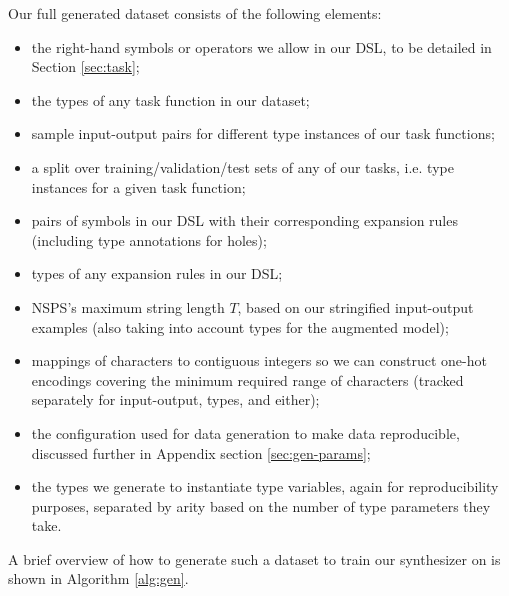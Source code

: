 \documentclass{article}
\begin{document}
Our full generated dataset consists of the following elements:
\begin{itemize}
    \item the right-hand symbols or operators we allow in our DSL, to be detailed in Section \ref{sec:task};
    \item the types of any task function in our dataset;
    \item sample input-output pairs for different type instances of our task functions;
    \item a split over training/validation/test sets of any of our tasks, i.e. type instances for a given task function;
    \item pairs of symbols in our DSL with their corresponding expansion rules (including type annotations for holes);
    \item types of any expansion rules in our DSL; %
    \item NSPS's maximum string length $T$, based on our stringified input-output examples (also taking into account types for the augmented model);
    \item mappings of characters to contiguous integers so we can construct one-hot encodings covering the minimum required range of characters (tracked separately for input-output, types, and either);
    \item the configuration used for data generation to make data reproducible, discussed further in Appendix section \ref{sec:gen-params};
    \item the types we generate to instantiate type variables, again for reproducibility purposes, separated by arity based on the number of type parameters they take.
\end{itemize}

A brief overview of how to generate such a dataset to train our synthesizer on is shown in Algorithm \ref{alg:gen}.
\end{document}
